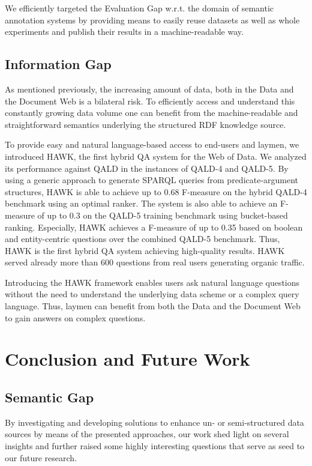 We efficiently targeted the Evaluation Gap w.r.t. the domain of semantic annotation systems by providing means to easily reuse datasets as well as whole experiments and publish their results in a machine-readable way.

\subsection*{Information Gap}

As mentioned previously, the increasing amount of data, both in the Data and the Document Web is a bilateral risk. 
To efficiently access and understand this constantly growing data volume one can benefit from the machine-readable and straightforward semantics underlying the structured RDF knowledge source. 

To provide easy and natural language-based access to end-users and laymen, we introduced HAWK, the first hybrid \ac{QA} system for the Web of Data.
We analyzed its performance against \ac{QALD} in the instances of \ac{QALD}-4 and \ac{QALD}-5.
By using a generic approach to generate SPARQL queries from predicate-argument structures,   HAWK is able to achieve up to 0.68 F-measure on the hybrid \ac{QALD}-4 benchmark using an optimal ranker.
The system is also able to achieve an F-measure of up to 0.3 on the \ac{QALD}-5 training benchmark using bucket-based ranking.
Especially, HAWK achieves a F-measure of up to 0.35 based on boolean and entity-centric questions over the combined \ac{QALD}-5 benchmark.
Thus, HAWK is the first hybrid QA system achieving high-quality results.
HAWK served already more than 600 questions from real users generating organic traffic.

Introducing the HAWK framework enables users ask natural language questions without the need to understand the underlying data scheme or a complex query language. 
Thus, laymen can benefit from both the Data and the Document Web to gain answers on complex questions. 



\section{Conclusion and Future Work}
\subsection*{Semantic Gap}

By investigating and developing solutions to enhance un- or semi-structured data sources by means of the presented approaches, our work shed light on several insights and further raised some highly interesting questions that serve as seed to our future research. 

